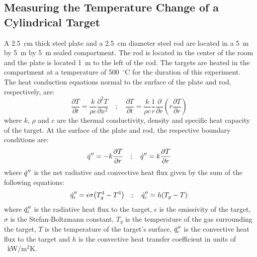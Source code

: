 \subsection{Measuring the Temperature Change of a Cylindrical Target}

A 2.5~cm thick steel plate and a 2.5~cm diameter steel rod are located in a 5~m by 5~m by 5~m sealed compartment. The rod is located in the center of the room and the plate is located 1~m to the left of the rod. The targets are heated in the compartment at a temperature of 500~$^\circ$C for the duration of this experiment. The heat conduction equations normal to the surface of the plate and rod, respectively, are:
\begin{equation}
\frac{\partial T}{\partial t} = \frac{k}{\rho c}\frac{\partial^2 T}{\partial x^2} \quad ; \quad \frac{\partial T}{\partial t} = \frac{k}{\rho c} \frac{1}{r} \frac{\partial}{\partial r} \left( r \frac{\partial T}{\partial r} \right)
\end{equation}
where $k$, $\rho$ and $c$ are the thermal conductivity, density and specific heat capacity of the target. At the surface of the plate and rod, the respective boundary conditions are:
\begin{equation}
\dot{q}'' = -k \frac{\partial T}{\partial r} \quad ; \quad \dot{q}'' = k \frac{\partial T}{\partial r}
\end{equation}
where $\dot{q}''$ is the net radiative and convective heat flux given by the sum of the following equations:
\begin{equation}
\dot{q}_{\rm r}'' = \epsilon \sigma { \left( { T_g^4 - T^4 } \right) } \quad ; \quad \dot{q}_{\rm c}'' = h { \left( {T_g - T} \right) }
\end{equation}
where $\dot{q}_{\rm r}''$ is the radiative heat flux to the target, $\epsilon$ is the emissivity of the target, $\sigma$ is the Stefan-Boltzmann constant, $T_g$ is the temperature of the gas surrounding the target, $T$ is the temperature of the target's surface, $\dot{q}_{\rm c}''$ is the convective heat flux to the target and $h$ is the convective heat transfer coefficient in units of ~kW/m$^2$K.
